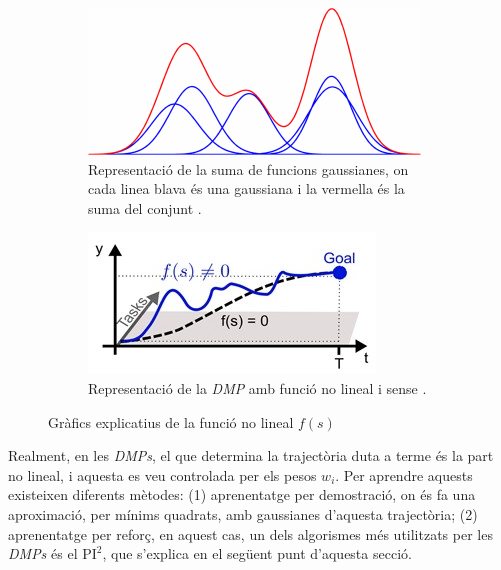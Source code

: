 \documentclass[12pt,a4paper,final,twoside]{article}
\begin{document}
\begin{figure}[tb]
\centering
\begin{subfigure}[h]{0.48\textwidth}
\includegraphics[width=\textwidth]{Imatges/gaussians-sum}
\caption{Representació de la suma de funcions gaussianes, on cada linea blava és una gaussiana i la vermella és la suma del conjunt \cite{Ruckert2012}.}
\label{fig:gaussians-sum}
\end{subfigure}
\begin{subfigure}[h]{0.48\textwidth}
\includegraphics[width=\textwidth]{Imatges/DMP-with-gaussians}
\caption{Representació de la \textit{DMP} amb funció no lineal i sense \cite{Ruckert2013}.}
\label{fig:DMP-with-gaussians}
\end{subfigure}
\caption{Gràfics explicatius de la funció no lineal $f(s)$}
\end{figure}

Realment, en les \textit{DMPs}, el que determina la trajectòria duta a terme és la part no lineal, i aquesta es veu controlada per els pesos $w_i$. Per aprendre aquests existeixen diferents mètodes: (1) aprenentatge per demostració, on és fa una aproximació, per mínims quadrats, amb gaussianes d'aquesta trajectòria; (2) aprenentatge per reforç, en aquest cas, un dels algorismes més utilitzats per les \textit{DMPs} és el $\mathrm{PI^2}$, que s'explica en el següent punt d'aquesta secció.
\end{document}

